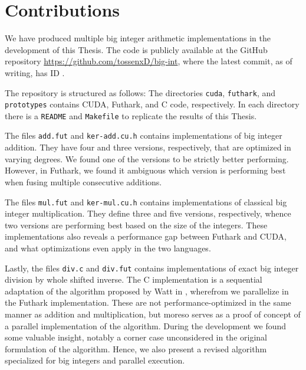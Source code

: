 \section{Contributions}
\label{sec:cont}

We have produced multiple big integer arithmetic implementations in the
development of this Thesis. The code is publicly available at the GitHub
repository \url{https://github.com/tossenxD/big-int}, where the latest commit,
as of writing, has ID {}.

The repository is structured as follows: The directories \texttt{cuda},
\texttt{futhark}, and \texttt{prototypes} contains CUDA, Futhark, and C code,
respectively. In each directory there is a \texttt{README} and \texttt{Makefile}
to replicate the results of this Thesis.

The files \texttt{add.fut} and \texttt{ker-add.cu.h} contains implementations of
big integer addition. They have four and three versions, respectively, that are
optimized in varying degrees. We found one of the versions to be strictly better
performing. However, in Futhark, we found it ambiguous which version is
performing best when fusing multiple consecutive additions.

The files \texttt{mul.fut} and \texttt{ker-mul.cu.h} contains implementations of
classical big integer multiplication. They define three and five versions,
respectively, whence two versions are performing best based on the size of the
integers. These implementations also reveals a performance gap between Futhark
and CUDA, and what optimizations even apply in the two languages.

Lastly, the files \texttt{div.c} and \texttt{div.fut} contains implementations
of exact big integer division by whole shifted inverse. The C implementation is
a sequential adaptation of the algorithm proposed by Watt in
\cite{watt2023efficient}, wherefrom we parallelize in the Futhark
implementation. These are not performance-optimized in the same manner as
addition and multiplication, but moreso serves as a proof of concept of a
parallel implementation of the algorithm. During the development we found some
valuable insight, notably a corner case unconsidered in the original formulation
of the algorithm. Hence, we also present a revised algorithm specialized for big
integers and parallel execution.

